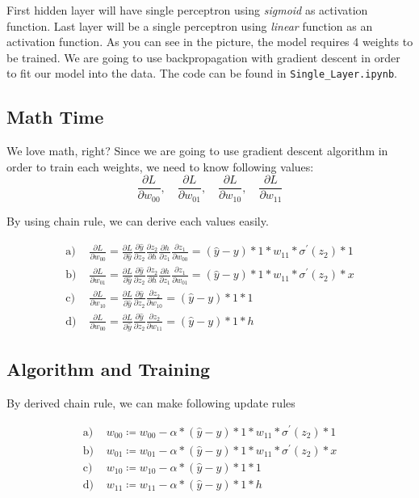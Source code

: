 \documentclass{homework}
\begin{document}
First hidden layer will have single perceptron using \textit{sigmoid} as activation function. Last layer will be a single perceptron using \textit{linear} function as an activation function. As you can see in the picture, the model requires 4 weights to be trained. We are going to use backpropagation with gradient descent in order to fit our model into the data. The code can be found in \texttt{Single_Layer.ipynb}.

\subsection{Math Time}
We love math, right? Since we are going to use gradient descent algorithm in order to train each weights, we need to know following values:
\[
    \frac{\partial L}{\partial w_00}, \quad \frac{\partial L}{\partial w_01}, \quad \frac{\partial L}{\partial w_10}, \quad \frac{\partial L}{\partial w_11}
\]

By using chain rule, we can derive each values easily.

\[
    \begin{aligned}
        \text{a) } &\frac{\partial L}{\partial w_{00}} = \frac{\partial L}{\partial \hat{y}}  \frac{\partial \hat{y}}{\partial z_2}  \frac{\partial z_2}{\partial h}  \frac{\partial h}{\partial z_1}  \frac{\partial z_1}{\partial w_{00}} = (\hat{y} - y) * 1 * w_{11} * \sigma^\prime(z_2) * 1\\
        \text{b) } &\frac{\partial L}{\partial w_{01}} = \frac{\partial L}{\partial \hat{y}} \frac{\partial \hat{y}}{\partial z_2} \frac{\partial z_2}{\partial h} \frac{\partial h}{\partial z_1} \frac{\partial z_1}{\partial w_{01}} = (\hat{y} - y) * 1 * w_{11} * \sigma^\prime(z_2) * x\\
        \text{c) } &\frac{\partial L}{\partial w_{10}} = \frac{\partial L}{\partial \hat{y}} \frac{\partial \hat{y}}{\partial z_2} \frac{\partial z_2}{\partial w_{10}} = (\hat{y} - y) * 1 * 1\\
        \text{d) } &\frac{\partial L}{\partial w_{00}} = \frac{\partial L}{\partial \hat{y}} \frac{\partial \hat{y}}{\partial z_2} \frac{\partial z_2}{\partial w_{11}} = (\hat{y} - y) * 1 * h
    \end{aligned}
\]
\pagebreak
\subsection{Algorithm and Training}
By derived chain rule, we can make following update rules

\[
    \begin{aligned}
    \text{a) } &w_{00} \coloneqq w_{00} - \alpha * (\hat{y} - y) * 1 * w_{11} * \sigma^\prime(z_2) * 1\\
    \text{b) } &w_{01} \coloneqq w_{01} - \alpha * (\hat{y} - y) * 1 * w_{11} * \sigma^\prime(z_2) * x\\
    \text{c) } &w_{10} \coloneqq w_{10} - \alpha * (\hat{y} - y) * 1 * 1\\
    \text{d) } &w_{11} \coloneqq w_{11} - \alpha * (\hat{y} - y) * 1 * h
    \end{aligned}
\]
\end{document}
